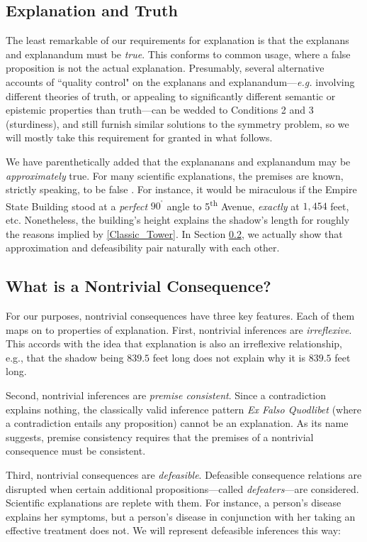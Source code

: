 \documentclass[natbib]{svjour3}                     %
\begin{document}
\subsection{Explanation and Truth}
\label{subsec:truth}
The  least remarkable of our requirements for explanation is that the explanans and explanandum must be \textit{true}.  This conforms to common usage, where a false proposition is not the actual explanation. Presumably, several alternative accounts of ``quality control" on the explanans and explanandum---\textit{e.g.} involving different theories of truth, or appealing to significantly different semantic or epistemic properties than truth---can be wedded to Conditions 2 and 3 (sturdiness), and still furnish similar solutions to the symmetry problem, so we will mostly take this requirement for granted in what follows.

We have parenthetically added that the explananans and explanandum may be \textit{approximately} true. For many scientific explanations, the premises are known, strictly speaking, to be false \cite{Cartwright1983}. For instance, it would be miraculous if the Empire State Building stood at a \textit{perfect} $90^{^\circ}$ angle to 5\textsuperscript{th} Avenue, \textit{exactly} at $1,454$ feet, etc. Nonetheless, the building's height explains the shadow's length for roughly the reasons implied by \ref{Classic_Tower}. In Section \ref{subsec:nontrivial}, we actually show that approximation and defeasibility pair naturally with each other.

\subsection{What is a Nontrivial Consequence?}
\label{subsec:nontrivial}
For our purposes, nontrivial consequences have three key features. Each of them maps on to properties of explanation. First, nontrivial inferences are \textit{irreflexive}. This accords with the idea that explanation is also an irreflexive relationship, e.g., that the shadow being $839.5$ feet long does not explain why it is $839.5$ feet long. 

Second, nontrivial inferences are \textit{premise consistent}.  Since a contradiction explains nothing, the classically valid inference pattern  \textit{Ex Falso Quodlibet} (where a contradiction entails any proposition) cannot be an explanation.  As its name suggests, premise consistency requires that the premises of a nontrivial consequence must be consistent.   

Third, nontrivial consequences are \textit{defeasible}. Defeasible consequence relations are disrupted when certain additional propositions---called \textit{defeaters}---are considered. Scientific explanations are replete with them. For instance, a person's disease explains her symptoms, but a person's disease in conjunction with her taking an effective treatment does not.  We will represent defeasible inferences this way:
\end{document}
